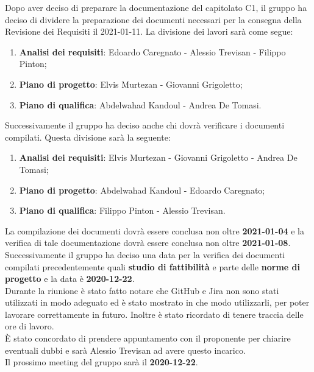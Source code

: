 Dopo aver deciso di preparare la documentazione del capitolato C1, il gruppo ha deciso di dividere la preparazione dei documenti necessari per la consegna della Revisione dei Requisiti il 2021-01-11. La divisione dei lavori sarà come segue:
\begin{enumerate}
\item \textbf{Analisi dei requisiti}: Edoardo Caregnato - Alessio Trevisan - Filippo Pinton;
\item \textbf{Piano di progetto}: Elvis Murtezan - Giovanni Grigoletto;
\item \textbf{Piano di qualifica}: Abdelwahad Kandoul - Andrea De Tomasi.
\end{enumerate}
Successivamente il gruppo ha deciso anche chi dovrà verificare i documenti compilati. Questa divisione sarà la seguente:
\begin{enumerate}
\item \textbf{Analisi dei requisiti}: Elvis Murtezan - Giovanni Grigoletto - Andrea De Tomasi;
\item \textbf{Piano di progetto}: Abdelwahad Kandoul - Edoardo Caregnato;
\item \textbf{Piano di qualifica}: Filippo Pinton - Alessio Trevisan.
\end{enumerate}
La compilazione dei documenti dovrà essere conclusa non oltre \textbf{2021-01-04} e la verifica di tale documentazione dovrà essere conclusa non oltre  \textbf{2021-01-08}.\\
Successivamente il gruppo ha deciso una data per la verifica dei documenti compilati precedentemente quali \textbf{studio di fattibilità} e parte delle \textbf{norme di progetto} e la data è \textbf{2020-12-22}.\\
Durante la riunione \`{e} stato fatto notare che GitHub e Jira non sono stati utilizzati in modo adeguato ed \`{e} stato mostrato in che modo utilizzarli, per poter lavorare correttamente in futuro. Inoltre \`{e} stato ricordato di tenere traccia delle ore di lavoro. \\
È stato concordato di prendere appuntamento con il proponente per chiarire eventuali dubbi e sarà Alessio Trevisan ad avere questo incarico. \\ 
Il prossimo meeting del gruppo sarà il \textbf{2020-12-22}.


